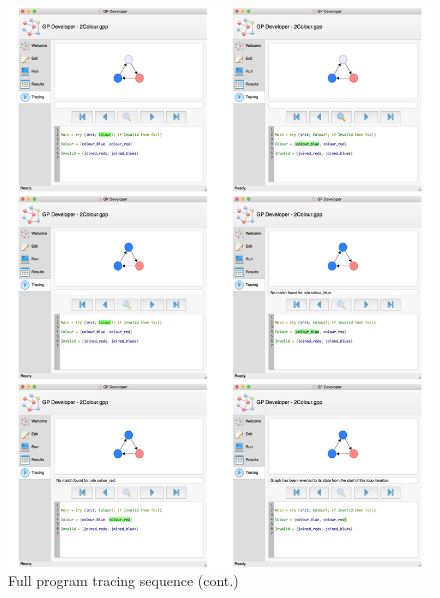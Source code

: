 \documentclass[authoryearcitations]{UoYCSproject}
\newenvironment{nscenter}
    {\parskip=0pt\par\nopagebreak\centering}
    {\par\noindent\ignorespacesafterend}
\begin{document}
\begin{appendices}
\begin{figure}[!htb]
    \ContinuedFloat
    \begin{nscenter}
        \includegraphics[width=\textwidth]{SeqCollage2}
    \end{nscenter}
    \caption{Full program tracing sequence (cont.)}
    \label{fig:TracingSequence}
\end{figure}


\end{appendices}
\end{document}

